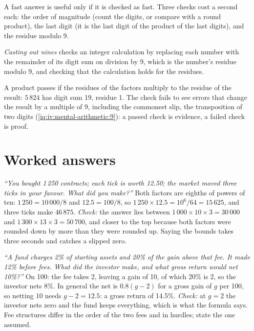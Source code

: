 A fast answer is useful only if it is checked as fast. Three checks cost a second each: the order of
magnitude (count the digits, or compare with a round product), the last digit (it is the last digit of the
product of the last digits), and the residue modulo 9.

\begin{definition}\label{def:iv:mental-arithmetic:nines}
\emph{Casting out nines} checks an integer calculation by replacing each number with the
remainder of its digit sum on division by 9, which is the number's residue modulo 9, and checking that the
calculation holds for the residues.
\end{definition}

A product passes if the residues of the factors multiply to the residue of the result: $5\,824$ has digit sum
19, residue 1. The check fails to see errors that change the result by a multiple of 9, including the commonest
slip, the transposition of two digits (\cref{iq:iv:mental-arithmetic:9}): a passed check is evidence, a failed
check is proof.

\section{Worked answers}

\begin{example}\label{ex:iv:mental-arithmetic:pnl}
\emph{``You bought 1\,250 contracts; each tick is worth 12.50; the market moved three ticks in your favour. What did you
make?''} Both factors are eighths of powers of ten: $1\,250 = 10\,000/8$ and $12.5 = 100/8$, so $1\,250 \times 12.5 =
10^6/64 = 15\,625$, and three ticks make $46\,875$. \emph{Check:} the answer lies between $1\,000 \times 10 \times 3 =
30\,000$ and $1\,300 \times 13 \times 3 = 50\,700$, and closer to the top because both factors were rounded down by more
than they were rounded up. Saying the bounds takes three seconds and catches a slipped zero.
\end{example}

\begin{example}\label{ex:iv:mental-arithmetic:fees}
\emph{``A fund charges 2\% of starting assets and 20\% of the gain above that fee. It made 12\% before fees. What did the
investor make, and what gross return would net 10\%?''} On 100: the fee takes 2, leaving a gain of 10, of which 20\% is
2, so the investor nets 8\%. In general the net is $0.8(g - 2)$ for a gross gain of $g$ per 100, so netting 10 needs $g - 2
= 12.5$: a gross return of 14.5\%. \emph{Check:} at $g = 2$ the investor nets zero and the fund keeps everything, which is
what the formula says. Fee structures differ in the order of the two fees and in hurdles; state the one assumed.
\end{example}

